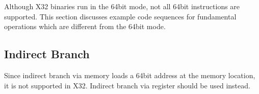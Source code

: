 Although X32 binaries run in the 64bit mode, not all 64bit instructions
are supported. This section discusses example code sequences for
fundamental operations which are different from the 64bit mode.

\subsection{Indirect Branch}

Since indirect branch via memory loads a 64bit address at the memory
location, it is not supported in X32.  Indirect branch via register
should be used instead.

\begin{table}[H]
\Hrule
\caption{Indirect Branch}
\begin{center}
\end{center}
\Hrule
\end{table}

